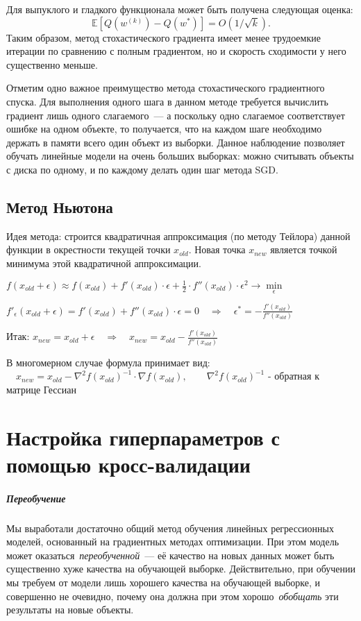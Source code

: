\documentclass[a4paper, 12pt]{article}
\theoremstyle{plain} %
\theoremstyle{definition} %
\theoremstyle{remark} %
\begin{document}
Для выпуклого и гладкого функционала может быть получена
следующая оценка:
\[
    \mathbb{E} \left[
        Q(w^{(k)}) - Q(w^*)
    \right]
    =
    O(1 / \sqrt{k}).
\]
Таким образом, метод стохастического градиента имеет менее
трудоемкие итерации по сравнению с полным градиентом,
но и скорость сходимости у него существенно меньше.

Отметим одно важное преимущество метода стохастического градиентного спуска.
Для выполнения одного шага в данном методе требуется вычислить градиент лишь одного слагаемого~---
а поскольку одно слагаемое соответствует ошибке на одном объекте,
то получается, что на каждом шаге необходимо держать в памяти всего один объект из выборки.
Данное наблюдение позволяет обучать линейные модели на очень больших выборках:
можно считывать объекты с диска по одному, и по каждому делать один шаг метода SGD.

\subsection{Метод Ньютона}

Идея метода: строится квадратичная аппроксимация (по методу Тейлора) данной функции в окрестности текущей точки $x_{old}$. Новая точка $x_{new}$ является точкой минимума этой квадратичной аппроксимации.

$f(x_{old} + \epsilon) \approx f(x_{old}) +  f'(x_{old}) \cdot \epsilon + \frac{1}{2} \cdot f''(x_{old}) \cdot \epsilon^2  \to \min\limits_{\epsilon} $

$f'_{\epsilon}(x_{old} + \epsilon) =   f'(x_{old}) + f''(x_{old}) \cdot \epsilon = 0 \quad  \Rightarrow \quad \boxed{\epsilon^{\ast} = - \frac{f'(x_{old})}{f''(x_{old})}}  $

Итак: $x_{new} = x_{old} + \epsilon \quad \Rightarrow \quad \boxed{x_{new} =  x_{old}  - \frac{f'(x_{old})}{f''(x_{old})}}$

В многомерном случае формула принимает вид: $\quad  x_{new} = x_{old} - \nabla^2 f(x_{old})^{-1} \cdot \nabla f(x_{old}),

\qquad \nabla^2 f(x_{old})^{-1}$ - обратная к матрице Гессиан

\section{Настройка гиперпараметров с помощью кросс-валидации}

\subparagraph{Переобучение}

Мы выработали достаточно общий метод обучения линейных регрессионных моделей,
основанный на градиентных методах оптимизации.
При этом модель может оказаться~\emph{переобученной}~--- её качество
на новых данных может быть существенно хуже качества на обучающей выборке.
Действительно, при обучении мы требуем от модели лишь хорошего качества на обучающей выборке,
и совершенно не очевидно, почему она должна при этом хорошо~\emph{обобщать} эти результаты
на новые объекты.
\end{document}
